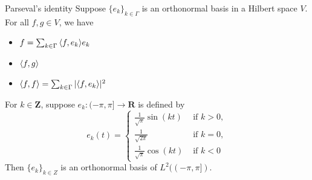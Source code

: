 \begin{stheorem}{Parseval's identity}{}
Suppose $\{e_k\}_{k \in \Gamma}$ is an orthonormal basis in a Hilbert space $V$. For all $f,g\in V$, we have
\begin{itemize}
	\item $f=\sum_{k \in \Gamma}{\langle f,e_k\rangle}e_k$
	\item ${\langle f,g\rangle}$
	\item ${\langle f,f\rangle}= \sum_{k \in \Gamma}|{\langle f,e_k\rangle}|^2$
\end{itemize}
\end{stheorem}

\begin{sexample}{}{}
For $k \in \mathbf{Z}$, suppose $e_k:(-\pi, \pi] \rightarrow \mathbf{R}$ is defined by
$$
e_k(t)= \begin{cases}\frac{1}{\sqrt{\pi}} \sin (k t) & \text { if } k>0, \\ 
\frac{1}{\sqrt{2 \pi}} & \text { if } k=0, \\ 
\frac{1}{\sqrt{\pi}} \cos (k t) & \text { if } k<0\end{cases}
$$
Then $\{e_k\}_{k \in Z}$ is an orthonormal basis of $L^2((-\pi,\pi])$.
\end{sexample}

